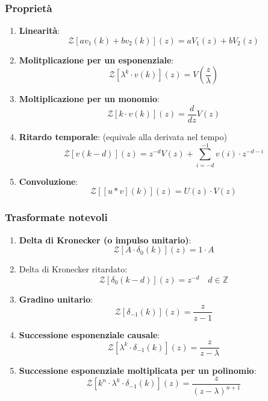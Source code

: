 \documentclass[a4paper]{article}
\begin{document}
\subsubsection{Proprietà}
\begin{enumerate}
  \item \textbf{Linearità}:
    \[
      \mathcal{Z}\left[ a v_1(k) + b v_2(k) \right](z) = a V_1(z) + b V_2(z)
    \] 

  \item \textbf{Molitplicazione per un esponenziale}:
    \[
      \mathcal{Z}\left[ \lambda^k \cdot v(k) \right](z) = V\left( \frac{z}{\lambda} \right)
    \] 

  \item \textbf{Moltiplicazione per un monomio}:
    \[
      \mathcal{Z}\left[ k \cdot v(k) \right](z) = \frac{d}{dz} V(z)
    \] 

  \item \textbf{Ritardo temporale}:
    (equivale alla derivata nel tempo)
    \[
      \mathcal{Z}\left[ v(k-d) \right](z) = z^{-d} V(z) + \sum_{i=-d}^{-1} v(i) \cdot z^{-d-i}
    \] 

  \item \textbf{Convoluzione}:
    \[
      \mathcal{Z}\left[ [u \ast v](k) \right](z) = U(z) \cdot V(z)
    \] 
\end{enumerate}

\subsubsection{Trasformate notevoli}
\begin{enumerate}
  \item \textbf{Delta di Kronecker (o impulso unitario)}:
    \[
      \mathcal{Z}\left[ A \cdot \delta_0(k) \right](z) = 1 \cdot A
    \]

  \item Delta di Kronecker ritardato:
    \[
      \mathcal{Z}\left[ \delta_0(k-d) \right](z) = z^{-d} \quad d \in \mathbb{Z}
    \] 

  \item \textbf{Gradino unitario}:
    \[
      \mathcal{Z}\left[ \delta_{-1}(k) \right](z) = \frac{z}{z-1}
    \] 

  \item \textbf{Successione esponenziale causale}:
    \[
      \mathcal{Z}\left[ \lambda^k \cdot \delta_{-1}(k) \right](z) =
      \frac{z}{z - \lambda}
    \]

  \item \textbf{Successione esponenziale moltiplicata per un polinomio}:
    \[
      \mathcal{Z}\left[ k^n \cdot \lambda^k \cdot \delta_{-1}(k) \right](z) =
       \frac{z}{(z - \lambda)^{n+1}} 
    \]
\end{enumerate}
\end{document}
